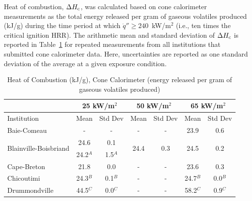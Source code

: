\documentclass{book}
\begin{document}
Heat of combustion, $\Delta H_{\rm c}$, was calculated based on cone calorimeter measurements as the total energy released per gram of gaseous volatiles produced (kJ/g) during the time period at which $\dot{q}'' \ge 240$~kW/m$^2$ (i.e., ten times the critical ignition HRR). The arithmetic mean and standard deviation of $\Delta H_{\rm c}$ is reported in Table~\ref{Table_13} for repeated measurements from all institutions that submitted cone calorimeter data. Here, uncertainties are reported as one standard deviation of the average at a given exposure condition.

\begin{table}[ht]
\caption{Heat of Combustion (kJ/g), Cone Calorimeter (energy released per gram of gaseous volatiles produced)}
\label{Table_13}
\begin{center}
\begin{tabular}{|l|cc|cc|cc|}
\hline
                                        & \multicolumn{2}{|c|}{25 kW/m$^2$} &  \multicolumn{2}{|c|}{50 kW/m$^2$}             & \multicolumn{2}{|c|}{65 kW/m$^2$}                 \\ \hline
Institution                             & Mean     & Std Dev                & Mean                  & Std Dev                & Mean                  & Std Dev                   \\ \hline
Baie-Comeau                             & -        & -                      & -                     & -                      & 23.9                  & 0.6                       \\
\multirow{2}{*}{Blainville-Boisbriand}  & 24.6     & 0.1                    & \multirow{2}{*}{24.4} & \multirow{2}{*}{0.3}   & \multirow{2}{*}{24.5} & \multirow{2}{*}{0.2}      \\
                                        & 24.2$^A$ & 1.5$^A$                &                       &                        &                       &                           \\
Cape-Breton                             & 21.8     & 0.0                    & -                     & -                      & 23.6                  & 0.3                       \\
Chicoutimi                              & 24.3$^B$ & 0.1$^B$                & -                     & -                      & 24.7$^B$              & 0.0$^B$                   \\
Drummondville                           & 44.5$^C$ & 0.0$^C$                & -                     & -                      & 58.2$^C$              & 0.9$^C$                   \\

\end{tabular}
\end{center}
\end{table}
\end{document}
